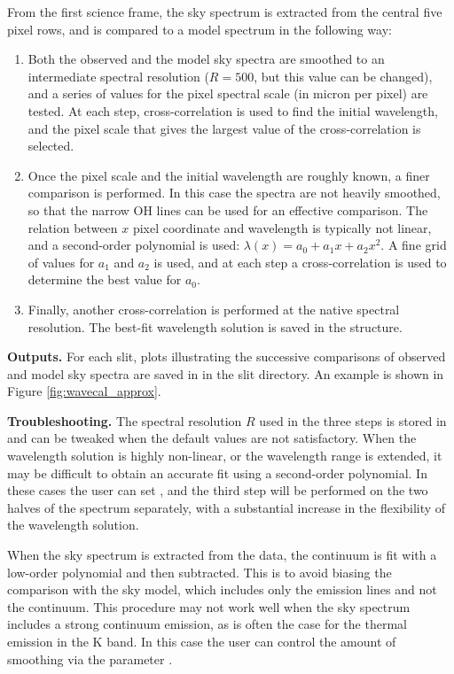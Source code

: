 \documentclass[a4paper]{article}
\begin{document}
\begin{sloppypar}
From the first science frame, the sky spectrum is extracted from the central five pixel rows, and is compared to a model spectrum in the following way:
\begin{enumerate}
\item Both the observed and the model sky spectra are smoothed to an intermediate spectral resolution ($R=500$, but this value can be changed), and a series of values for the pixel spectral scale (in micron per pixel) are tested. At each step, cross-correlation is used to find the initial wavelength, and the pixel scale that gives the largest value of the cross-correlation is selected.
\item Once the pixel scale and the initial wavelength are roughly known, a finer comparison is performed. In this case the spectra are not heavily smoothed, so that the narrow OH lines can be used for an effective comparison. The relation between $x$ pixel coordinate and wavelength is typically not linear, and a second-order polynomial is used: $\lambda(x) = a_0 + a_1 x + a_2 x^2$. A fine grid of values for $a_1$ and $a_2$ is used, and at each step a cross-correlation is used to determine the best value for $a_0$.
\item Finally, another cross-correlation is performed at the native spectral resolution. The best-fit wavelength solution is saved in the  structure.
\end{enumerate}

\medskip
\noindent
\textbf{Outputs.} For each slit, plots illustrating the successive comparisons of observed and model sky spectra are saved in  in the slit directory. An example is shown in Figure \ref{fig:wavecal_approx}.

\medskip
\noindent
\textbf{Troubleshooting.} The spectral resolution $R$ used in the three steps is stored in  and can be tweaked when the default values are not satisfactory. When the wavelength solution is highly non-linear, or the wavelength range is extended, it may be difficult to obtain an accurate fit using a second-order polynomial. In these cases the user can set , and the third step will be performed on the two halves of the spectrum separately, with a substantial increase in the flexibility of the wavelength solution.

When the sky spectrum is extracted from the data, the continuum is fit with a low-order polynomial and then subtracted. This is to avoid biasing the comparison with the sky model, which includes only the emission lines and not the continuum. This procedure may not work well when the sky spectrum includes a strong continuum emission, as is often the case for the thermal emission in the K band. In this case the user can control the amount of smoothing via the parameter .


\end{sloppypar}
\end{document}
